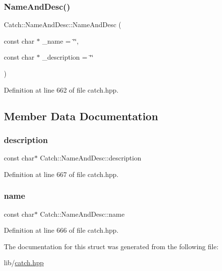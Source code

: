 \subsubsection{\texorpdfstring{Name\+And\+Desc()}{NameAndDesc()}}
{\footnotesize\ttfamily Catch\+::\+Name\+And\+Desc\+::\+Name\+And\+Desc (\begin{DoxyParamCaption}\item[{const char $\ast$}]{\+\_\+name = {\ttfamily \char`\"{}\char`\"{}},  }\item[{const char $\ast$}]{\+\_\+description = {\ttfamily \char`\"{}\char`\"{}} }\end{DoxyParamCaption})\hspace{0.3cm}{\ttfamily [inline]}}



Definition at line 662 of file catch.\+hpp.



\subsection{Member Data Documentation}
\hypertarget{struct_catch_1_1_name_and_desc_a3463a23ff65ce494fc380452b57b7970}{}\label{struct_catch_1_1_name_and_desc_a3463a23ff65ce494fc380452b57b7970} 
\subsubsection{\texorpdfstring{description}{description}}
{\footnotesize\ttfamily const char$\ast$ Catch\+::\+Name\+And\+Desc\+::description}



Definition at line 667 of file catch.\+hpp.

\hypertarget{struct_catch_1_1_name_and_desc_a374b4ed8be3cf98be20ebde5273bde51}{}\label{struct_catch_1_1_name_and_desc_a374b4ed8be3cf98be20ebde5273bde51} 
\subsubsection{\texorpdfstring{name}{name}}
{\footnotesize\ttfamily const char$\ast$ Catch\+::\+Name\+And\+Desc\+::name}



Definition at line 666 of file catch.\+hpp.



The documentation for this struct was generated from the following file\+:\begin{DoxyCompactItemize}
\item 
lib/\hyperlink{catch_8hpp}{catch.\+hpp}\end{DoxyCompactItemize}

